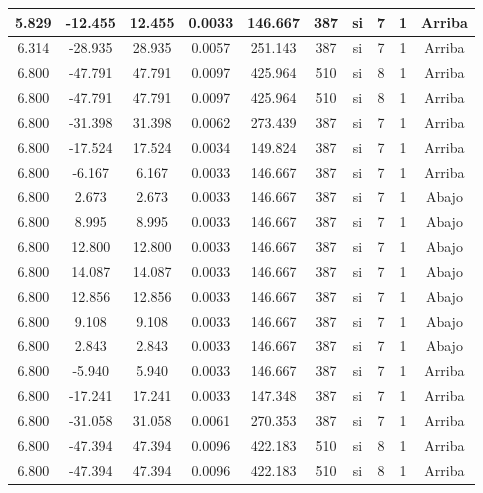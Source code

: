 \begin{table}[H]
{\begin{tabular}{|c|c|c|c|c|c|c|c|c|c|}
    \hline
    5.829 & -12.455 & 12.455 & 0.0033 & 146.667 & 387 & si  & 7   & 1   & Arriba \bigstrut\\
    \hline
    6.314 & -28.935 & 28.935 & 0.0057 & 251.143 & 387 & si  & 7   & 1   & Arriba \bigstrut\\
    \hline
    6.800 & -47.791 & 47.791 & 0.0097 & 425.964 & 510 & si  & 8   & 1   & Arriba \bigstrut\\
    \hline
    6.800 & -47.791 & 47.791 & 0.0097 & 425.964 & 510 & si  & 8   & 1   & Arriba \bigstrut\\
    \hline
    6.800 & -31.398 & 31.398 & 0.0062 & 273.439 & 387 & si  & 7   & 1   & Arriba \bigstrut\\
    \hline
    6.800 & -17.524 & 17.524 & 0.0034 & 149.824 & 387 & si  & 7   & 1   & Arriba \bigstrut\\
    \hline
    6.800 & -6.167 & 6.167 & 0.0033 & 146.667 & 387 & si  & 7   & 1   & Arriba \bigstrut\\
    \hline
    6.800 & 2.673 & 2.673 & 0.0033 & 146.667 & 387 & si  & 7   & 1   & Abajo \bigstrut\\
    \hline
    6.800 & 8.995 & 8.995 & 0.0033 & 146.667 & 387 & si  & 7   & 1   & Abajo \bigstrut\\
    \hline
    6.800 & 12.800 & 12.800 & 0.0033 & 146.667 & 387 & si  & 7   & 1   & Abajo \bigstrut\\
    \hline
    6.800 & 14.087 & 14.087 & 0.0033 & 146.667 & 387 & si  & 7   & 1   & Abajo \bigstrut\\
    \hline
    6.800 & 12.856 & 12.856 & 0.0033 & 146.667 & 387 & si  & 7   & 1   & Abajo \bigstrut\\
    \hline
    6.800 & 9.108 & 9.108 & 0.0033 & 146.667 & 387 & si  & 7   & 1   & Abajo \bigstrut\\
    \hline
    6.800 & 2.843 & 2.843 & 0.0033 & 146.667 & 387 & si  & 7   & 1   & Abajo \bigstrut\\
    \hline
    6.800 & -5.940 & 5.940 & 0.0033 & 146.667 & 387 & si  & 7   & 1   & Arriba \bigstrut\\
    \hline
    6.800 & -17.241 & 17.241 & 0.0033 & 147.348 & 387 & si  & 7   & 1   & Arriba \bigstrut\\
    \hline
    6.800 & -31.058 & 31.058 & 0.0061 & 270.353 & 387 & si  & 7   & 1   & Arriba \bigstrut\\
    \hline
    6.800 & -47.394 & 47.394 & 0.0096 & 422.183 & 510 & si  & 8   & 1   & Arriba \bigstrut\\
    \hline
    6.800 & -47.394 & 47.394 & 0.0096 & 422.183 & 510 & si  & 8   & 1   & Arriba \bigstrut\\

\end{tabular}}
\end{table}
